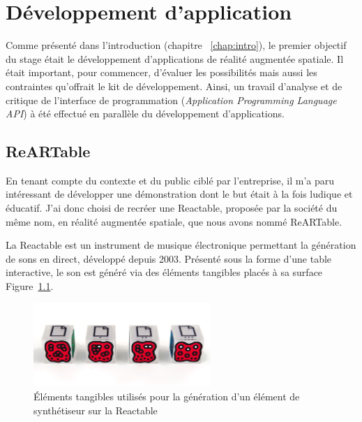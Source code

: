 \chapter{Développement d'application}

Comme présenté dans l'introduction (chapitre ~\ref{chap:intro}), le premier objectif du stage était le développement d'applications de réalité augmentée spatiale. Il était important, pour commencer, d'évaluer les possibilités mais aussi les contraintes qu'offrait le kit de développement. 
Ainsi, un travail d'analyse et de critique de l'interface de programmation (\emph{Application Programming Language API}) à été effectué en parallèle du développement d'applications.

\section{ReARTable}
\label{sec:reartable}
En tenant compte du contexte et du public ciblé par l'entreprise, il m'a paru intéressant de développer une démonstration dont le but était à la fois ludique et éducatif. J'ai donc choisi de recréer une Reactable\cite{reactable}, proposée par la société du même nom, en réalité augmentée spatiale, que nous avons nommé ReARTable.

La Reactable est un instrument de musique électronique permettant la génération de sons en direct, développé depuis 2003. Présenté sous la forme d'une table interactive, le son est généré via des éléments tangibles placés à sa surface Figure~\ref{fig:reactelem}. 

\begin{figure}[H]
\centering
\includegraphics[width=0.6\textwidth]{images/reactelements}
\caption{Éléments tangibles utilisés pour la génération d'un élément de synthétiseur sur la Reactable\protect\footnotemark}
\label{fig:reactelem}
\end{figure}


